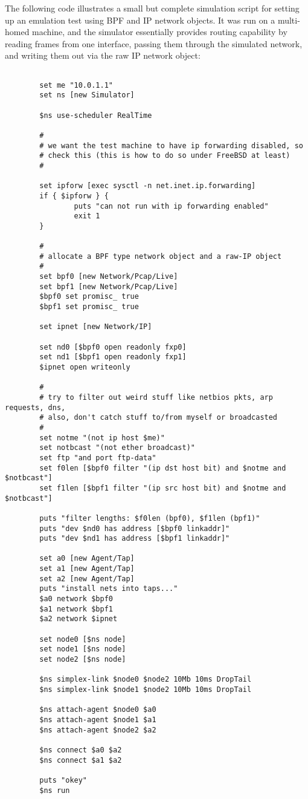 The following code illustrates a small but complete
simulation script for setting up an emulation test using BPF and
IP network objects.
It was run on a multi-homed machine, and the simulator essentially
provides routing capability by reading frames from one interface,
passing them through the simulated network, and writing them
out via the raw IP network object:
\begin{verbatim}

        set me "10.0.1.1"
        set ns [new Simulator]

        $ns use-scheduler RealTime

        #
        # we want the test machine to have ip forwarding disabled, so
        # check this (this is how to do so under FreeBSD at least)
        #

        set ipforw [exec sysctl -n net.inet.ip.forwarding]
        if { $ipforw } {
                puts "can not run with ip forwarding enabled"
                exit 1
        }

        #
        # allocate a BPF type network object and a raw-IP object
        #
        set bpf0 [new Network/Pcap/Live]
        set bpf1 [new Network/Pcap/Live]
        $bpf0 set promisc_ true
        $bpf1 set promisc_ true

        set ipnet [new Network/IP]

        set nd0 [$bpf0 open readonly fxp0]
        set nd1 [$bpf1 open readonly fxp1]
        $ipnet open writeonly

        #
        # try to filter out weird stuff like netbios pkts, arp requests, dns,
        # also, don't catch stuff to/from myself or broadcasted
        #
        set notme "(not ip host $me)"
        set notbcast "(not ether broadcast)"
        set ftp "and port ftp-data"
        set f0len [$bpf0 filter "(ip dst host bit) and $notme and $notbcast"]
        set f1len [$bpf1 filter "(ip src host bit) and $notme and $notbcast"]

        puts "filter lengths: $f0len (bpf0), $f1len (bpf1)"
        puts "dev $nd0 has address [$bpf0 linkaddr]"
        puts "dev $nd1 has address [$bpf1 linkaddr]"

        set a0 [new Agent/Tap]
        set a1 [new Agent/Tap]
        set a2 [new Agent/Tap]
        puts "install nets into taps..."
        $a0 network $bpf0
        $a1 network $bpf1
        $a2 network $ipnet

        set node0 [$ns node]
        set node1 [$ns node]
        set node2 [$ns node]

        $ns simplex-link $node0 $node2 10Mb 10ms DropTail
        $ns simplex-link $node1 $node2 10Mb 10ms DropTail

        $ns attach-agent $node0 $a0
        $ns attach-agent $node1 $a1
        $ns attach-agent $node2 $a2

        $ns connect $a0 $a2
        $ns connect $a1 $a2

        puts "okey"
        $ns run
\end{verbatim}

\endinput
